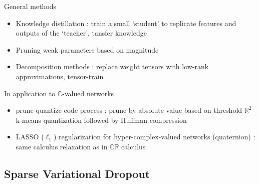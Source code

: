 \documentclass{beamer}
\newcommand{\real}{\mathbb{R}}
\newcommand{\cplx}{\mathbb{C}}
\begin{document}
\begin{frame}[c]{\insertsection}
  General methods
  \begin{itemize}
    \item Knowledge distillation \citep{hinton_distilling_2015,balasubramanian_deep_2016}:
      train a small `student' to replicate features and outputs of the `teacher',
      tansfer knowledge
    \item Pruning weak parameters based on magnitude \citep{han_deep_2016,zhu_prune_2018}
    \item Decomposition methods \citep{novikov_tensorizing_2015,citation_needed}:
      replace weight tensors with low-rank approximations, tensor-train
  \end{itemize}

  \medskip
  In application to $\cplx$-valued networks
  \begin{itemize}
    \item prune-quantize-code process \citep{wu_compressing_2019}:
      prune by absolute value based on threshold
      $\real^2$ k-means quantization followed by Huffman compression
    \item LASSO ($\ell_1$) regularization for hyper-complex-valued networks
    (quaternion) \citep{vecchi_compressing_2020}:
      same calculus relaxation as in $\cplx\real$ calculus
  \end{itemize}

\end{frame}

\subsection{Sparse Variational Dropout} %
\label{sub:sparse_variational_dropout}
\end{document}

